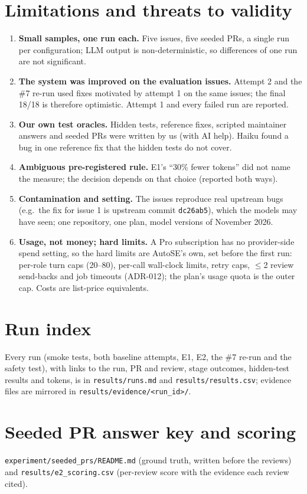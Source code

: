 \documentclass[10pt,a4paper]{article}
\newcommand{\adr}[1]{ADR-#1}
\begin{document}
\section{Limitations and threats to validity}
\begin{enumerate}
\item \textbf{Small samples, one run each.} Five issues, five seeded PRs, a single run per configuration; LLM output is
non-deterministic, so differences of one run are not significant.
\item \textbf{The system was improved on the evaluation issues.} Attempt 2 and the \#7 re-run used fixes motivated by
attempt 1 on the same issues; the final 18/18 is therefore optimistic. Attempt 1 and every failed run are reported.
\item \textbf{Our own test oracles.} Hidden tests, reference fixes, scripted maintainer answers and seeded PRs were written
by us (with AI help). Haiku found a bug in one reference fix that the hidden tests do not cover.
\item \textbf{Ambiguous pre-registered rule.} E1's ``30\% fewer tokens'' did not name the measure; the decision depends on
that choice (reported both ways).
\item \textbf{Contamination and setting.} The issues reproduce real upstream bugs (e.g.\ the fix for issue 1 is upstream
commit \texttt{dc26ab5}), which the models may have seen; one repository, one plan, model versions of November 2026.
\item \textbf{Usage, not money; hard limits.} A Pro subscription has no provider-side spend setting, so the hard limits
are AutoSE's own, set before the first run: per-role turn caps (20--80), per-call wall-clock limits, retry caps, $\le$2
review send-backs and job timeouts (\adr{012}); the plan's usage quota is the outer cap. Costs are list-price equivalents.
\end{enumerate}

\clearpage
\appendix
\section{Run index}
Every run (smoke tests, both baseline attempts, E1, E2, the \#7 re-run and the safety test), with links to the run, PR
and review, stage outcomes, hidden-test results and tokens, is in \texttt{results/runs.md} and \texttt{results/results.csv};
evidence files are mirrored in \texttt{results/evidence/<run\_id>/}.

\section{Seeded PR answer key and scoring}
\texttt{experiment/seeded\_prs/README.md} (ground truth, written before the reviews) and \texttt{results/e2\_scoring.csv}
(per-review score with the evidence each review cited).
\end{document}
